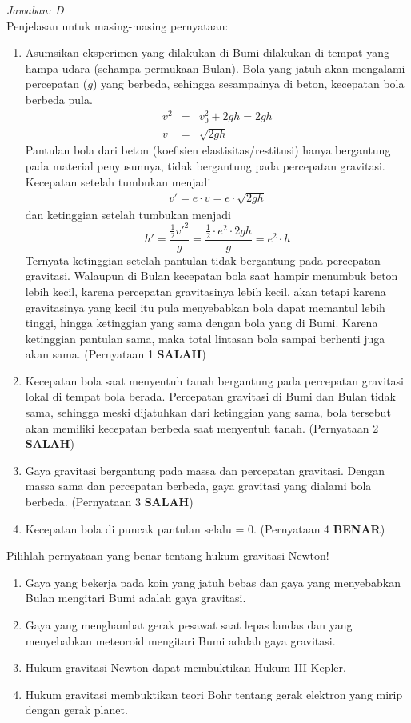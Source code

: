 \documentclass[11pt,fleqn, a4paper]{exam}
\begin{document}
\begin{questions}
\textit{Jawaban: D}\\
Penjelasan untuk masing-masing pernyataan:
\begin{enumerate}
\item Asumsikan eksperimen yang dilakukan di Bumi dilakukan di tempat yang hampa udara (sehampa permukaan Bulan). Bola yang jatuh akan mengalami percepatan ($g$) yang berbeda, sehingga sesampainya di beton, kecepatan bola berbeda pula. 
\begin{eqnarray*}
v^2 &=& v_{0}^2 + 2 g h = 2gh\\
v &=& \sqrt{2gh}
\end{eqnarray*}
Pantulan bola dari beton (koefisien elastisitas/restitusi) hanya bergantung pada material penyusunnya, tidak bergantung pada percepatan gravitasi. Kecepatan setelah tumbukan menjadi
\begin{eqnarray*}
v' = e \cdot v = e \cdot \sqrt{2gh}
\end{eqnarray*}
dan ketinggian setelah tumbukan menjadi
\begin{equation*}
h' = \frac{\frac{1}{2} v'^2}{g} = \frac{\frac{1}{2} \cdot e^2 \cdot 2gh}{g} = e^2 \cdot h
\end{equation*}
Ternyata ketinggian setelah pantulan tidak bergantung pada percepatan gravitasi. Walaupun di Bulan kecepatan bola  saat hampir menumbuk beton lebih kecil, karena percepatan gravitasinya lebih kecil, akan tetapi karena gravitasinya yang kecil itu pula menyebabkan bola dapat memantul lebih tinggi, hingga ketinggian yang sama dengan bola yang di Bumi. Karena ketinggian pantulan sama, maka total lintasan bola sampai berhenti juga akan sama. (Pernyataan 1 \textbf{SALAH})
\item Kecepatan bola saat menyentuh tanah bergantung pada percepatan gravitasi lokal di tempat bola berada. Percepatan gravitasi di Bumi dan Bulan tidak sama, sehingga meski dijatuhkan dari ketinggian yang sama, bola tersebut akan memiliki kecepatan berbeda saat menyentuh tanah. (Pernyataan 2 \textbf{SALAH})
\item Gaya gravitasi bergantung pada massa dan percepatan gravitasi. Dengan massa sama dan percepatan berbeda, gaya gravitasi yang dialami bola berbeda. (Pernyataan 3 \textbf{SALAH})
\item Kecepatan bola di puncak pantulan selalu = 0. (Pernyataan 4 \textbf{BENAR})
\end{enumerate}


\question Pilihlah pernyataan yang benar tentang hukum gravitasi Newton!
\begin{enumerate}
\item Gaya yang bekerja pada koin yang jatuh bebas dan gaya yang menyebabkan Bulan mengitari Bumi adalah gaya gravitasi.
\item Gaya yang menghambat gerak pesawat saat lepas landas dan yang menyebabkan meteoroid mengitari Bumi adalah gaya gravitasi. 
\item Hukum gravitasi Newton dapat membuktikan Hukum III Kepler.
\item Hukum gravitasi membuktikan teori Bohr tentang gerak elektron yang mirip dengan gerak planet.
\end{enumerate}


\end{questions}
\end{document}
